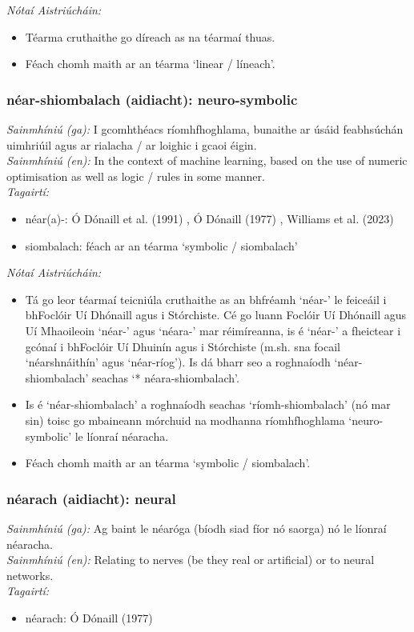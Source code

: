  \noindent \textit{Nótaí Aistriúcháin:}
\begin{itemize}
	\item Téarma cruthaithe go díreach as na téarmaí thuas.
	\item Féach chomh maith ar an téarma `linear / líneach'.
\end{itemize}


\subsubsection*{néar-shiombalach (aidiacht): neuro-symbolic}
 \noindent \textit{Sainmhíniú (ga):} I gcomhthéacs ríomhfhoghlama, bunaithe ar úsáid feabhsúchán uimhriúil agus ar rialacha / ar loighic i gcaoi éigin.
\\
 \noindent \textit{Sainmhíniú (en):} In the context of machine learning, based on the use of numeric optimisation as well as logic / rules in some manner.
\\
 \noindent \textit{Tagairtí:}
\begin{itemize}
	\item néar(a)-: Ó Dónaill et al. (1991) \cite{focloir-beag}, Ó Dónaill (1977) \cite{odonaill}, Williams et al. (2023) \cite{storchiste}
	\item siombalach: féach ar an téarma `symbolic / siombalach'
\end{itemize}

 \noindent \textit{Nótaí Aistriúcháin:}
\begin{itemize}
	\item Tá go leor téarmaí teicniúla cruthaithe as an bhfréamh `néar-' le feiceáil i bhFoclóir Uí Dhónaill agus i Stórchiste. Cé go luann Foclóir Uí Dhónaill agus Uí Mhaoileoin `néar-' agus `néara-' mar réimíreanna, is é `néar-' a fheictear i gcónaí i bhFoclóir Uí Dhuinín agus i Stórchiste (m.sh. sna focail `néarshnáithín' agus `néar-ríog'). Is dá bharr seo a roghnaíodh `néar-shiombalach' seachas `* néara-shiombalach'.
	\item Is é `néar-shiombalach' a roghnaíodh seachas `ríomh-shiombalach' (nó mar sin) toisc go mbaineann mórchuid na modhanna ríomhfhoghlama `neuro-symbolic' le líonraí néaracha.
	\item Féach chomh maith ar an téarma `symbolic / siombalach'.
\end{itemize}


\subsubsection*{néarach (aidiacht): neural}
 \noindent \textit{Sainmhíniú (ga):} Ag baint le néaróga (bíodh siad fíor nó saorga) nó le líonraí néaracha.
\\
 \noindent \textit{Sainmhíniú (en):} Relating to nerves (be they real or artificial) or to neural networks.
\\
 \noindent \textit{Tagairtí:}
\begin{itemize}
	\item néarach: Ó Dónaill (1977) \cite{odonaill}
\end{itemize}

